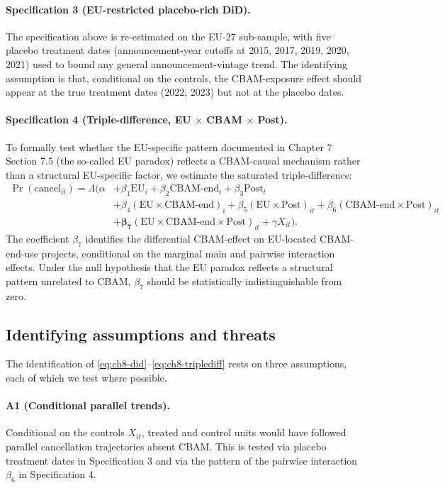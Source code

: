 \documentclass[11pt,a4paper]{article}
\begin{document}
\paragraph{Specification 3 (EU-restricted placebo-rich DiD).} The specification above is re-estimated on the EU-27 sub-sample, with five placebo treatment dates (announcement-year cutoffs at 2015, 2017, 2019, 2020, 2021) used to bound any general announcement-vintage trend. The identifying assumption is that, conditional on the controls, the CBAM-exposure effect should appear at the true treatment dates (2022, 2023) but not at the placebo dates.

\paragraph{Specification 4 (Triple-difference, EU $\times$ CBAM $\times$ Post).} To formally test whether the EU-specific pattern documented in Chapter 7 Section 7.5 (the so-called EU paradox) reflects a CBAM-causal mechanism rather than a structural EU-specific factor, we estimate the saturated triple-difference:
\begin{align}
\Pr(\text{cancel}_{it}) = \Lambda(\alpha &+ \beta_1 \text{EU}_i + \beta_2 \text{CBAM-end}_i + \beta_3 \text{Post}_t \nonumber \\
&+ \beta_4 (\text{EU} \times \text{CBAM-end})_i + \beta_5 (\text{EU} \times \text{Post})_{it} + \beta_6 (\text{CBAM-end} \times \text{Post})_{it} \nonumber \\
&+ \boldsymbol{\beta_7} (\text{EU} \times \text{CBAM-end} \times \text{Post})_{it} + \gamma X_{it}).
\label{eq:ch8-triplediff}
\end{align}
The coefficient $\beta_7$ identifies the differential CBAM-effect on EU-located CBAM-end-use projects, conditional on the marginal main and pairwise interaction effects. Under the null hypothesis that the EU paradox reflects a structural pattern unrelated to CBAM, $\beta_7$ should be statistically indistinguishable from zero.

\subsection{Identifying assumptions and threats}

The identification of \eqref{eq:ch8-did}--\eqref{eq:ch8-triplediff} rests on three assumptions, each of which we test where possible.

\paragraph{A1 (Conditional parallel trends).} Conditional on the controls $X_{it}$, treated and control units would have followed parallel cancellation trajectories absent CBAM. This is tested via placebo treatment dates in Specification 3 and via the pattern of the pairwise interaction $\beta_6$ in Specification 4.
\end{document}
